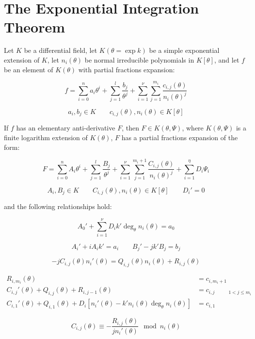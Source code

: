 \vfill\eject
\section{The Exponential Integration Theorem}

\theorem\label{exponential integration theorem}
Let $K$ be a differential field, let $K(\theta = \exp k)$ be a simple
exponential extension of $K$, let $n_i(\theta)$ be
normal irreducible polynomials in $K[\theta]$,
and let $f$ be an element of $K(\theta)$
with partial fractions expansion:

$$f = \sum_{i=0}^n a_i \theta^i + \sum_{j=1}^{l} \frac{b_{j}}{\theta^j}
+ \sum_{i=1}^\nu \sum_{j=1}^{m_i} \frac{c_{i,j}(\theta)}{n_i(\theta)^j}$$

$$a_i, b_j \in K \qquad c_{i,j}(\theta),n_i(\theta) \in K[\theta]$$

If $f$ has
an elementary anti-derivative $F$, then $F \in K(\theta, \Psi)$,
where $K(\theta, \Psi)$ is a finite logarithm extension
of $K(\theta)$, $F$ has a partial fractions expansion of the form:

$$F = \sum_{i=0}^n A_i \theta^i + \sum_{j=1}^{l} \frac{B_{j}}{\theta^j}
+ \sum_{i=1}^\nu \sum_{j=1}^{m_i+1} \frac{C_{i,j}(\theta)}{n_i(\theta)^j}
+ \sum_{i=1}^\eta D_i \Psi_i$$

$$A_i, B_j \in K \qquad C_{i,j}(\theta),n_i(\theta) \in K[\theta] \qquad D_i' = 0$$

and the following relationships hold:

$$A_0' + \sum_{i=1}^\nu D_i k' \deg_\theta n_i(\theta) = a_0$$

$$A_i' + i A_i k' = a_i  \qquad  B_{j}' - j k' B_{j} = b_j$$

$$-jC_{i,j}(\theta)n_i'(\theta) = Q_{i,j}(\theta) n_i(\theta) + R_{i,j}(\theta)$$

\begin{align*}
R_{i,m_i}(\theta) & = c_{i,m_i+1} \\
C_{i,j}'(\theta) + Q_{i,j}(\theta) + R_{i,j-1}(\theta) & = c_{i,j} \qquad {}_{1<j\le m_i}\\
C_{i,1}'(\theta) + Q_{i,1}(\theta) + D_i \left[ n_i'(\theta) - k' n_i(\theta) \deg_\theta n_i(\theta) \right] & = c_{i,1}
\end{align*}


$$C_{i,j}(\theta) \equiv - \frac{R_{i,j}(\theta)}{jn_i'(\theta)} \mod n_i(\theta)$$


